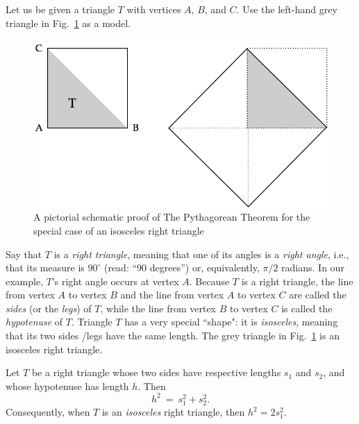 \medskip


Let us be given a triangle $T$ with vertices $A$, $B$, and $C$.  Use the left-hand grey triangle in
Fig.~\ref{fig:unitsquare} as a model.
\begin{figure}[htb]
\begin{center}
       \includegraphics[scale=0.3]{FiguresArithmetic/UnitSquareSQRT2}
\caption{A pictorial schematic proof of The Pythagorean Theorem for the special case of an isosceles right triangle
\label{fig:unitsquare}}
\end{center}
\end{figure}
Say that $T$ is a {\it right triangle}, meaning that one of its angles is a {\em right angle}, i.e., that its measure is $90^\circ$ (read: ``$90$ degrees'') or, equivalently, $\pi/2$ radians.  In our example, $T$'s right angle occurs at vertex $A$.  Because $T$ is a right triangle, the line from vertex $A$ to vertex $B$ and the line from vertex $A$ to vertex $C$ are called the {\em sides} (or the {\it legs}) of $T$, while the line from vertex $B$ to vertex $C$ is called the {\em hypotenuse} of $T$.  Triangle $T$ has a very special ``shape": it is {\em isosceles}, meaning that its two sides /legs have the same length.  The grey triangle in Fig.~\ref{fig:unitsquare} is an isosceles right triangle.

\begin{theorem}
\label{thm:Pythagorean-thm}
Let $T$ be a right triangle whose two sides have respective lengths $s_1$ and $s_2$, and whose hypotenuse has length $h$.  Then
\[ h^2 \ = \ s_1^2 + s_2^2. \]
Consequently, when $T$ is an {\em isosceles} right triangle, then $h^2 = 2 s_1^2$.
\end{theorem}

